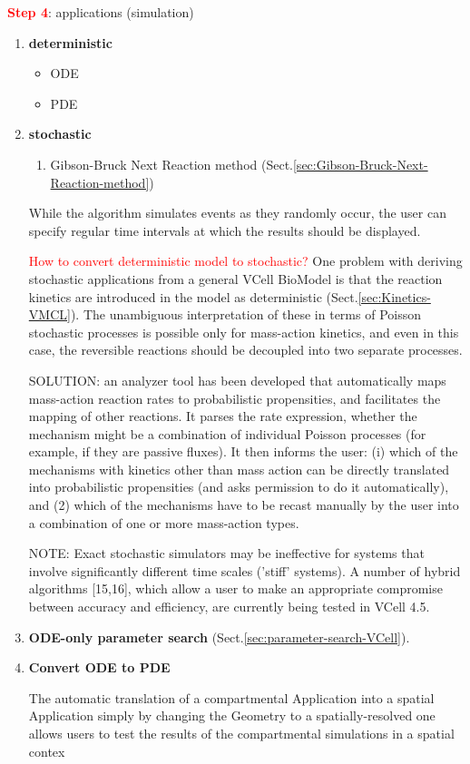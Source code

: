 \textcolor{red}{\bf Step 4}: applications (simulation)
\begin{enumerate}
  \item {\bf deterministic}
  \begin{itemize}
    \item ODE
    
    \item PDE
  \end{itemize}
  
  \item {\bf stochastic}
  
  \begin{enumerate}
    \item Gibson-Bruck Next Reaction method
    (Sect.\ref{sec:Gibson-Bruck-Next-Reaction-method})

  \end{enumerate}

While the algorithm simulates events as they randomly occur, the user can specify
regular time intervals at which the results should be displayed.


\textcolor{red}{How to convert deterministic model to stochastic?}
One problem with deriving stochastic applications from a general VCell BioModel
is that the reaction kinetics are introduced in the model as deterministic
(Sect.\ref{sec:Kinetics-VMCL}).
The unambiguous interpretation of these in terms of Poisson stochastic processes
is possible only for mass-action kinetics, and even in this case, the reversible
reactions should be decoupled into two separate processes.

SOLUTION: an analyzer tool has been developed that automatically maps
mass-action reaction rates to probabilistic propensities, and facilitates the
mapping of other reactions.
It parses the rate expression, whether the mechanism might be a combination of
individual Poisson processes (for example, if they are passive fluxes). It then
informs the user: (i) which of the mechanisms with kinetics other than mass
action can be directly translated into probabilistic propensities (and asks
permission to do it automatically), and (2) which of the mechanisms have to be
recast manually by the user into a combination of one or more mass-action types.

NOTE: Exact stochastic simulators may be ineffective for systems that involve
significantly different time scales ('stiff' systems). A number of hybrid
algorithms [15,16], which allow a user to make an appropriate compromise between
accuracy and efficiency, are currently being tested in VCell 4.5.

  \item {\bf ODE-only parameter search}
(Sect.\ref{sec:parameter-search-VCell}).

  
  \item {\bf Convert ODE to PDE}
  
The automatic translation of a compartmental Application into a spatial Application simply by
changing the Geometry to a spatially-resolved one allows users to test the results of the
compartmental simulations in a spatial contex

\end{enumerate}


